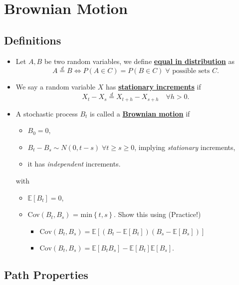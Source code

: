 \documentclass[twocolumn,landscape,10pt]{article}
\theoremstyle{definition}
\begin{document}
\section{Brownian Motion}

\subsection{Definitions}

\begin{itemize}
    \item Let $A, B$ be two random variables, we define \textbf{\underline{equal
        in distribution}} as
        \[
            A\stackrel{d}{=}B
            \iff
            P(A\in C)=P(B\in C)\;\forall \text{ possible sets $C$}.
        \]
    \item
        We say a random variable $X$ has \textbf{\underline{stationary
        increments}} if
        \[
            X_t-X_s\stackrel{d}{=}X_{t+h}-X_{s+h} \quad\forall h>0.
        \]
    \item 
        A stochastic process $B_t$ is called a 
        \textbf{\underline{Brownian motion}} if
        \begin{itemize}
            \item $B_0 = 0$,
            \item $B_t-B_s\sim N(0,t-s) \;\forall t\ge s\ge 0$, implying
                \emph{stationary} increments,
            \item it has \emph{independent} increments.
        \end{itemize}
        with
        \begin{itemize}
            \item $\mathbb{E}[B_t] = 0$,
            \item Cov$(B_t,B_s)$ = min$\left\{t,s\right\}$. Show this using
                (Practice!)
                \begin{itemize}
                    \item $\text{Cov}(B_t,B_s)=\mathbb{E}[(B_t-\mathbb{E}[B_t])(B_s-\mathbb{E}[B_s])]$
                    \item
                        $\text{Cov}(B_t,B_s)=\mathbb{E}[B_tB_s]-\mathbb{E}[B_t]\mathbb{E}[B_s]$.
                \end{itemize}
        \end{itemize}
\end{itemize}

\subsection{Path Properties}
\end{document}
